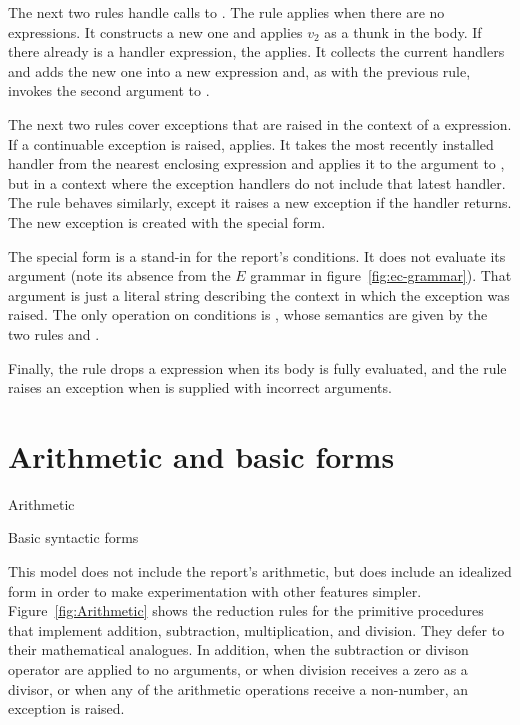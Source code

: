 The next two rules handle calls to .
The  rule applies when there are no 
expressions. It constructs a new one and applies $v_2$ as a
thunk in the  body. If there already is a handler
expression, the  applies. It collects the current
handlers and adds the new one into a new  expression
and, as with the previous rule, invokes the second argument to
.

The next two rules cover exceptions that are raised in the context of
a  expression. If a continuable exception is raised,
 applies. It takes the most recently installed
handler from the nearest enclosing  expression and
applies it to the argument to , but in a
context where the exception handlers do not include that latest
handler. The  rule behaves similarly, except it
raises a new exception if the handler returns. The new exception is
created with the  special form.

The  special form is a stand-in for the report's
conditions. It does not evaluate its argument (note its absence from
the $E$ grammar in figure~\ref{fig:ec-grammar}). That argument
is just a literal string describing the context in which the exception
was raised. The only operation on conditions is ,
whose semantics are given by the two rules  and
.

Finally, the rule  drops a  expression
when its body is fully evaluated, and the rule 
raises an exception when  is supplied with
incorrect arguments.

\section{Arithmetic and basic forms}

\beginfig
\begin{center}

\end{center}
\caption{Arithmetic}\label{fig:Arithmetic}
\endfig

\beginfig
\begin{center}

\end{center}
\caption{Basic syntactic forms}\label{fig:Basic--syntactic--forms}
\endfig

This model does not include the report's arithmetic, but does include
an idealized form in order to make experimentation with other features
simpler. Figure~\ref{fig:Arithmetic} shows the reduction rules for the
primitive procedures that implement addition, subtraction,
multiplication, and division. They defer to their mathematical
analogues. In addition, when the subtraction or divison operator are
applied to no arguments, or when division receives a zero as a
divisor, or when any of the arithmetic operations receive a
non-number, an exception is raised.

